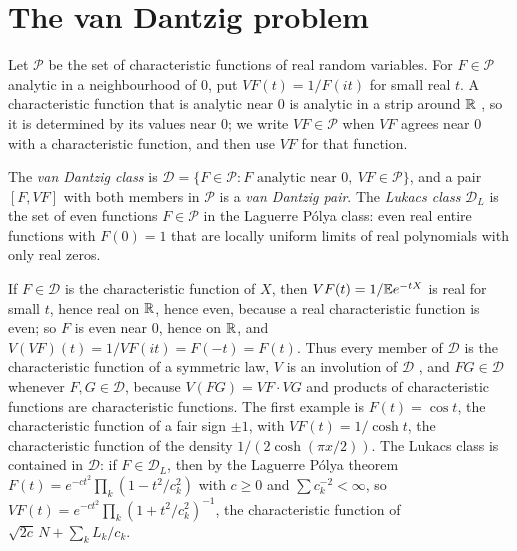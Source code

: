 \section{The van Dantzig problem}

Let $\mathcal P$ be the set of characteristic functions of real random variables. For $F\in\mathcal P$ analytic in a neighbourhood of $0$, put $VF(t) = 1/F(it)$ for small real $t$. A characteristic function that is analytic near $0$ is analytic in a strip around $\mathbb{R}$ \cite{lukacs1970}, so it is determined by its values near $0$; we write $VF\in\mathcal P$ when $VF$ agrees near $0$ with a characteristic function, and then use $VF$ for that function.

\begin{definition}\label{def:10dvdp}
The \emph{van Dantzig class} is $\mathcal D = \{F\in\mathcal P: F\text{ analytic near }0,\allowbreak\ VF\in\mathcal P\}$, and a pair $[F,VF]$ with both members in $\mathcal P$ is a \emph{van Dantzig pair}. The \emph{Lukacs class} $\mathcal D_L$ is the set of even functions $F\in\mathcal P$ in the Laguerre P\'olya class: even real entire functions with $F(0)=1$ that are locally uniform limits of real polynomials with only real zeros.
\end{definition}

If $F\in\mathcal D$ is the characteristic function of $X$, then $VF(t) = 1/\mathbb{E} e^{-tX}$ is real for small $t$, hence real on $\mathbb{R}$, hence even, because a real characteristic function is even; so $F$ is even near $0$, hence on $\mathbb{R}$, and $V(VF)(t) = 1/VF(it) = F(-t) = F(t)$. Thus every member of $\mathcal D$ is the characteristic function of a symmetric law, $V$ is an involution of $\mathcal D$ \cite{konstantopoulospatiesarkar2024}, and $FG\in\mathcal D$ whenever $F,G\in\mathcal D$, because $V(FG) = VF\cdot VG$ and products of characteristic functions are characteristic functions. The first example is $F(t) = \cos t$, the characteristic function of a fair sign $\pm1$, with $VF(t) = 1/\cosh t$, the characteristic function of the density $1/(2\cosh(\pi x/2))$. The Lukacs class is contained in $\mathcal D$: if $F\in\mathcal D_L$, then by the Laguerre P\'olya theorem $F(t) = e^{-ct^2}\prod_k(1-t^2/c_k^2)$ with $c\ge0$ and $\sum c_k^{-2}<\infty$, so $VF(t) = e^{-ct^2}\prod_k(1+t^2/c_k^2)^{-1}$, the characteristic function of $\sqrt{2c}\,N+\sum_kL_k/c_k$.

